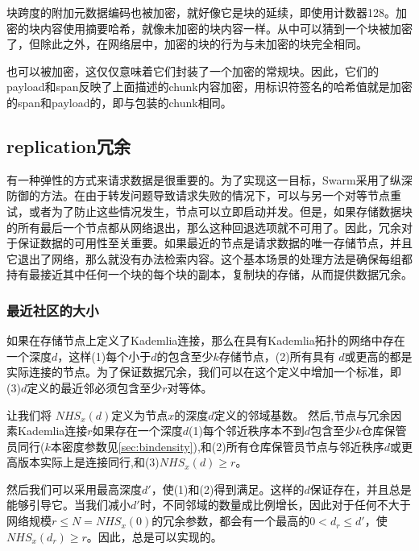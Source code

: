 块跨度的附加元数据编码也被加密，就好像它是块的延续，即使用计数器128。加密的块内容使用摘要哈希，就像未加密的块内容一样。从中可以猜到一个块被加密了，但除此之外，在网络层中，加密的块的行为与未加密的块完全相同。

也可以被加密，这仅仅意味着它们封装了一个加密的常规块。因此，它们的payload和span反映了上面描述的chunk内容加密，用标识符签名的哈希值就是加密的span和payload的，即与包装的chunk相同。

\subsection{replication冗余\statusgreen}\label{sec:redundancy-by-local-replication}

有一种弹性的方式来请求数据是很重要的。为了实现这一目标，Swarm采用了纵深防御的方法。在由于转发问题导致请求失败的情况下，可以与另一个对等节点重试，或者为了防止这些情况发生，节点可以立即启动并发。但是，如果存储数据块的所有最后一个节点都从网络退出，那么这种回退选项就不可用了。因此，冗余对于保证数据的可用性至关重要。如果最近的节点是请求数据的唯一存储节点，并且它退出了网络，那么就没有办法检索内容。这个基本场景的处理方法是确保每组都持有最接近其中任何一个块的每个块的副本，复制块的存储，从而提供数据冗余。 

\subsubsection{最近社区的大小}

如果在存储节点上定义了Kademlia连接，那么在具有Kademlia拓扑的网络中存在一个深度$d$，这样(1)每个小于$d$的包含至少$k$存储节点，(2)所有具有 $d$或更高的都是实际连接的节点。为了保证数据冗余，我们可以在这个定义中增加一个标准，即(3)$d$定义的最近邻必须包含至少$r$对等体。

让我们将 $\mathit{NHS}_x(d)$定义为节点$x$的深度$d$定义的邻域基数。
然后,节点与冗余因素Kademlia连接$r$如果存在一个深度$d$(1)每个邻近秩序本不到$d$包含至少$k$仓库保管员同行($k$本密度参数见\ref{sec:bindensity}),和(2)所有仓库保管员节点与邻近秩序$d$或更高版本实际上是连接同行,和(3)$\mathit{NHS}_x(d)\geq r$。

然后我们可以采用最高深度$d'$，使(1)和(2)得到满足。这样的$d$保证存在，并且总是能够引导它。当我们减小$d'$时，不同邻域的数量成比例增长，因此对于任何不大于网络规模$r\leq N=\mathit{NHS}_x(0)$的冗余参数，都会有一个最高的$0<d_r\leq d'$，使$\mathit{NHS}_x(d_r)\geq r$。因此，总是可以实现的。



